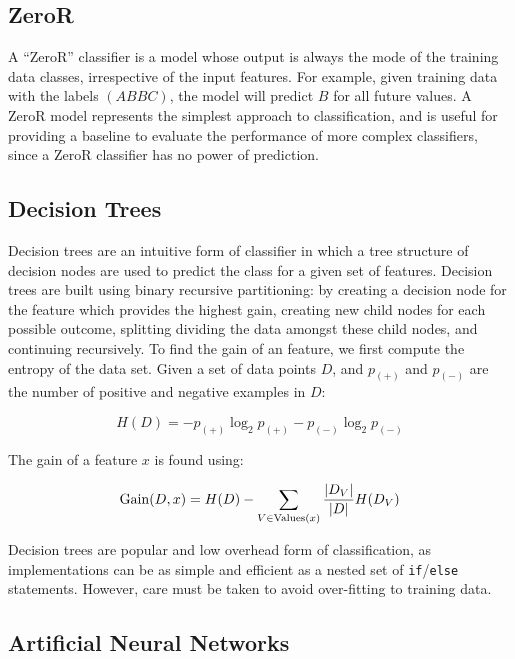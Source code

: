 \subsection{ZeroR}

A ``ZeroR'' classifier is a model whose output is always the mode of the training data classes, irrespective of the input features. For example, given training data with the labels $\left( A B B C \right)$, the model will predict $B$ for all future values. A ZeroR model represents the simplest approach to classification, and is useful for providing a baseline to evaluate the performance of more complex classifiers, since a ZeroR classifier has no power of prediction.


\subsection{Decision Trees}

Decision trees are an intuitive form of classifier in which a tree structure of decision nodes are used to predict the class for a given set of features. Decision trees are built using binary recursive partitioning: by creating a decision node for the feature which provides the highest gain, creating new child nodes for each possible outcome, splitting dividing the data amongst these child nodes, and continuing recursively. To find the gain of an feature, we first compute the entropy of the data set. Given a set of data points $D$, and $p_{(+)}$ and $p_{(-)}$ are the number of positive and negative examples in $D$:

\begin{equation}
  H(D) = - p_{(+)}\log_2p_{(+)} - p_{(-)}\log_2p_{(-)}
\end{equation}

The gain of a feature $x$ is found using:

\begin{equation}
  \operatorname*{Gain}(D, x) = H(D) - \sum_{V \in \text{Values}(x)}\frac{|D_V|}{|D|}H(D_V)
\end{equation}

Decision trees are popular and low overhead form of classification, as implementations can be as simple and efficient as a nested set of \texttt{if}/\texttt{else} statements. However, care must be taken to avoid over-fitting to training data.


\subsection{Artificial Neural Networks}

